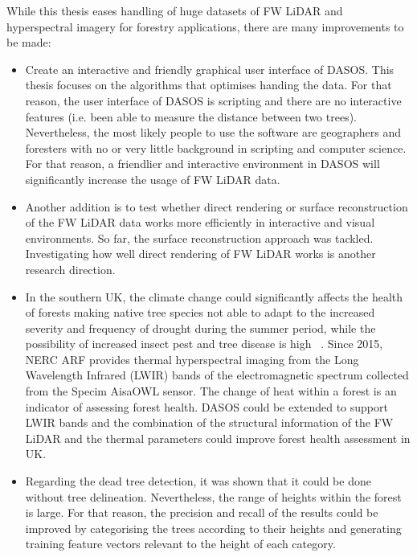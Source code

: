 \documentclass{subfiles}
\begin{document}
{\color{blue}
\par While this thesis eases handling of huge datasets of FW LiDAR and hyperspectral imagery for forestry applications, there are many improvements to be made:
\begin{itemize}
	\item Create an interactive and friendly graphical user interface of DASOS. This thesis focuses on the algorithms that optimises handing the data. For that reason, the user interface of DASOS is scripting and there are no interactive features (i.e. been able to measure the distance between two trees). Nevertheless, the most likely people to use the software are geographers and foresters with no or very little background in scripting and computer science. For that reason, a friendlier and interactive environment in DASOS will significantly increase the usage of FW LiDAR data.  
	\item Another addition is to test whether direct rendering or surface reconstruction of the FW LiDAR data works more efficiently in interactive and visual environments. So far, the surface reconstruction approach was tackled. Investigating how well direct rendering of FW LiDAR works is another research direction. 
	\item In the southern UK, the climate change could significantly affects the health of forests making native tree species not able to adapt to the increased severity and frequency of drought during the summer period, while the possibility of increased insect pest and tree disease is high ~\cite{Read2009}.  Since 2015, NERC ARF provides thermal hyperspectral imaging from the Long Wavelength Infrared (LWIR) bands of the electromagnetic spectrum collected from the Specim AisaOWL sensor. The change of heat within a forest is an indicator of assessing forest health. DASOS could be extended to support LWIR bands and the combination of the structural information of the FW LiDAR and the thermal parameters could improve forest health assessment in UK.  	
	\item Regarding the dead tree detection, it was shown that it could be done without tree delineation. Nevertheless, the range of heights within the forest is large. For that reason, the precision and recall of the results could be improved by categorising the trees according to their heights and generating training feature vectors relevant to the height of each category.  
	
\end{itemize}



\par 


\par 
}
\end{document}

